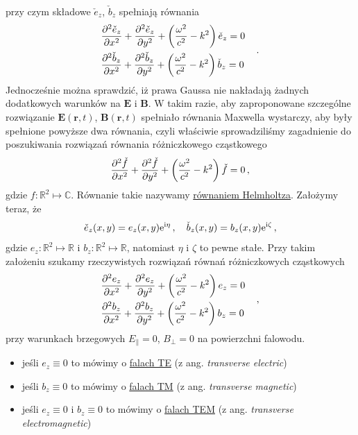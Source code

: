 \documentclass[../main.tex]{subfiles}
\begin{document}
przy czym składowe \(\check e_z\), \(\check b_z\) spełniają równania
\begin{equation*}
    \begin{split}
        &\pdv[2]{\check e_z}{x}+\pdv[2]{\check e_z}{y}+\left(\frac{\omega^2}{c^2}-k^2\right)\check e_z=0\\
        &\pdv[2]{\check b_z}{x}+\pdv[2]{\check b_z}{y}+\left(\frac{\omega^2}{c^2}-k^2\right)\check b_z=0
    \end{split}\quad\,.
\end{equation*}
Jednocześnie można sprawdzić, iż prawa Gaussa nie nakładają żadnych dodatkowych warunków na
\(\mathbf{E}\) i \(\mathbf{B}\). W takim razie, aby zaproponowane szczególne rozwiązanie
\(\mathbf{E}(\mathbf{r},t)\), \(\mathbf{B}(\mathbf{r},t)\) spełniało równania Maxwella wystarczy,
aby były spełnione powyższe dwa równania, czyli właściwie sprowadziliśmy zagadnienie do poszukiwania
rozwiązań równania różniczkowego cząstkowego
\begin{equation*}
    \pdv[2]{\check f}{x}+\pdv[2]{\check f}{y}+\left(\frac{\omega^2}{c^2}-k^2\right)\check f=0\,,
\end{equation*}
gdzie \(f:\mathbb{R}^2\mapsto\mathbb{C}\). Równanie takie nazywamy \underline{równaniem Helmholtza}.
Założymy teraz, że
\begin{equation*}
    \check e_z(x,y)=e_z(x,y)\mathrm{e}^{\mathrm{i}\eta}\,,\quad \check b_z(x,y)=b_z(x,y)\mathrm{e}^{\mathrm{i}\zeta}\,,
\end{equation*}
gdzie \(e_z:\mathbb{R}^2\mapsto\mathbb{R}\) i \(b_z:\mathbb{R}^2\mapsto\mathbb{R}\), natomiast
\(\eta\) i \(\zeta\) to pewne stałe. Przy takim założeniu szukamy rzeczywistych rozwiązań równań
różniczkowych cząstkowych
\begin{equation*}
    \begin{split}
        &\pdv[2]{e_z}{x}+\pdv[2]{e_z}{y}+\left(\frac{\omega^2}{c^2}-k^2\right)e_z=0\\
        &\pdv[2]{b_z}{x}+\pdv[2]{b_z}{y}+\left(\frac{\omega^2}{c^2}-k^2\right)b_z=0
    \end{split}\quad\,,
\end{equation*}
przy warunkach brzegowych \(E_\parallel=0\), \(B_\perp=0\) na powierzchni falowodu.
\begin{itemize}
    \item jeśli \(e_z\equiv 0\) to mówimy o \underline{falach TE} (z ang. \textit{transverse
    electric})
    \item jeśli \(b_z\equiv 0\) to mówimy o \underline{falach TM} (z ang. \textit{transverse
    magnetic})
    \item jeśli \(e_z\equiv 0\) i \(b_z\equiv 0\) to mówimy o \underline{falach TEM} (z ang.
    \textit{transverse electromagnetic})
\end{itemize}
\end{document}
